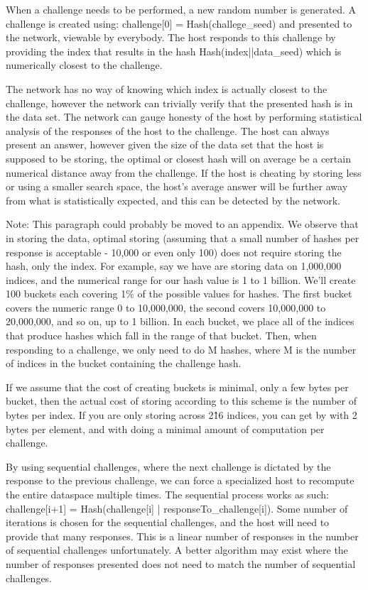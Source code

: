 \documentclass[twocolumn]{article}
\begin{document}
\begin{appendices}
When a challenge needs to be performed, a new random number is generated.
A challenge is created using: challenge[0] = Hash(challege\_seed) and presented to the network, viewable by everybody.
The host responds to this challenge by providing the index that results in the hash Hash(index||data\_seed) which is numerically closest to the challenge.

The network has no way of knowing which index is actually closest to the challenge, however the network can trivially verify that the presented hash is in the data set.
The network can gauge honesty of the host by performing statistical analysis of the responses of the host to the challenge.
The host can always present an answer, however given the size of the data set that the host is supposed to be storing, the optimal or closest hash will on average be a certain numerical distance away from the challenge.
If the host is cheating by storing less or using a smaller search space, the host's average answer will be further away from what is statistically expected, and this can be detected by the network.

Note: This paragraph could probably be moved to an appendix.
We observe that in storing the data, optimal storing (assuming that a small number of hashes per response is acceptable - 10,000 or even only 100) does not require storing the hash, only the index.
For example, say we have are storing data on 1,000,000 indices, and the numerical range for our hash value is 1 to 1 billion.
We'll create 100 buckets each covering 1\% of the possible values for hashes.
The first bucket covers the numeric range 0 to 10,000,000, the second covers 10,000,000 to 20,000,000, and so on, up to 1 billion.
In each bucket, we place all of the indices that produce hashes which fall in the range of that bucket.
Then, when responding to a challenge, we only need to do M hashes, where M is the number of indices in the bucket containing the challenge hash.

If we assume that the cost of creating buckets is minimal, only a few bytes per bucket, then the actual cost of storing according to this scheme is the number of bytes per index.
If you are only storing across 2\^16 indices, you can get by with 2 bytes per element, and with doing a minimal amount of computation per challenge.

By using sequential challenges, where the next challenge is dictated by the response to the previous challenge, we can force a specialized host to recompute the entire dataspace multiple times.
The sequential process works as such: challenge[i+1] = Hash(challenge[i] | responseTo\_challenge[i]).
Some number of iterations is chosen for the sequential challenges, and the host will need to provide that many responses.
This is a linear number of responses in the number of sequential challenges unfortunately.
A better algorithm may exist where the number of responses presented does not need to match the number of sequential challenges.


\end{appendices}
\end{document}
